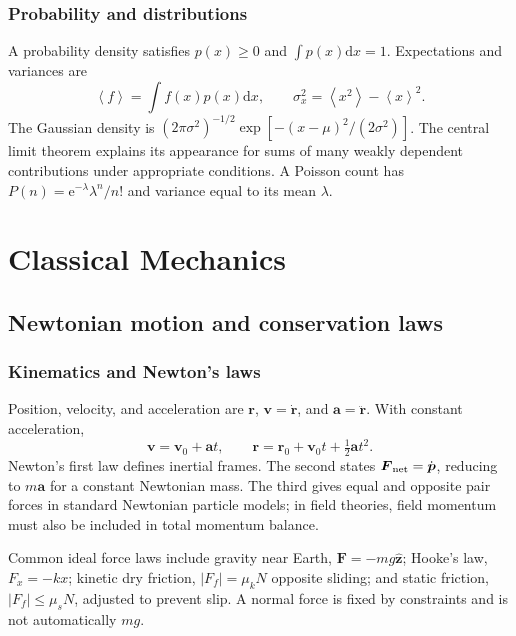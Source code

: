 \documentclass[11pt,oneside]{book}
\newcommand{\dd}{\mathrm{d}}
\newcommand{\ee}{\mathrm{e}}
\newcommand{\vect}[1]{\boldsymbol{#1}}
\newcommand{\avg}[1]{\left\langle #1\right\rangle}
\theoremstyle{reviewstyle}
\begin{document}
\section{Probability and distributions}
A probability density satisfies $p(x)\geq0$ and $\int p(x)\dd x=1$. Expectations and variances are
\begin{equation}
\avg{f}=\int f(x)p(x)\dd x,\qquad \sigma_x^2=\avg{x^2}-\avg{x}^2.
\end{equation}
The Gaussian density is $(2\pi\sigma^2)^{-1/2}\exp[-(x-\mu)^2/(2\sigma^2)]$. The central limit theorem explains its appearance for sums of many weakly dependent contributions under appropriate conditions. A Poisson count has $P(n)=\ee^{-\lambda}\lambda^n/n!$ and variance equal to its mean $\lambda$.

\part{Classical Mechanics}
\chapter{Newtonian motion and conservation laws}
\section{Kinematics and Newton's laws}
Position, velocity, and acceleration are $\vect r$, $\vect v=\dot{\vect r}$, and $\vect a=\ddot{\vect r}$. With constant acceleration,
\begin{equation}
\vect v=\vect v_0+\vect at,\qquad
\vect r=\vect r_0+\vect v_0t+\tfrac12\vect at^2.
\end{equation}
Newton's first law defines inertial frames. The second states $\vect F_{\rm net}=\dot{\vect p}$, reducing to $m\vect a$ for a constant Newtonian mass. The third gives equal and opposite pair forces in standard Newtonian particle models; in field theories, field momentum must also be included in total momentum balance.

Common ideal force laws include gravity near Earth, $\vect F=-mg\hat{\vect z}$; Hooke's law, $F_x=-kx$; kinetic dry friction, $|F_f|=\mu_kN$ opposite sliding; and static friction, $|F_f|\leq\mu_sN$, adjusted to prevent slip. A normal force is fixed by constraints and is not automatically $mg$.
\end{document}
